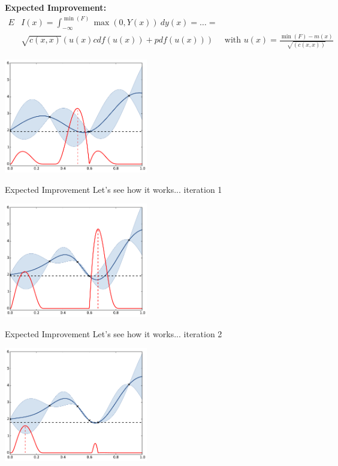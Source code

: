 \documentclass{beamer}
\begin{document}
\begin{frame}{}
\textbf{Expected Improvement:}
\begin{equation*}
\begin{split}
E&I(x) =  \int_{-\infty}^{\min(F)} \max\left(0,Y(x)\right) ~dy(x) = \dots = \\
& \sqrt{c(x,x)} (u(x) cdf(u(x)) + pdf(u(x))) \quad \text{ with } u(x) = \frac{\min(F) - m(x)}{\sqrt{(c(x,x))}}
\end{split}
\end{equation*}
\begin{center}
\includegraphics[height=5cm]{figures/python/ego_EI0}
\end{center}
\end{frame}

\begin{frame}{Expected Improvement}
Let's see how it works... iteration 1
\begin{center}
\includegraphics[height=5cm]{figures/python/ego_EI1}
\end{center}
\end{frame}

\begin{frame}[noframenumbering]{Expected Improvement}
Let's see how it works... iteration 2
\begin{center}
\includegraphics[height=5cm]{figures/python/ego_EI2}
\end{center}
\end{frame}
\end{document}

